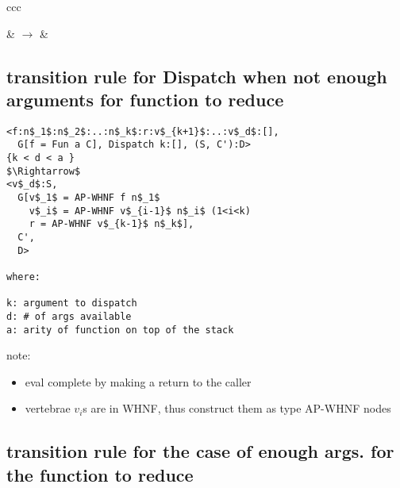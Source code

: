 \documentclass[8pt]{extarticle}
\begin{document}
\begin{multicols*}{2}
\begin{itemize}
\begin{tblr}{ccc}
 &
$\rightarrow$ &
\end{tblr}

\end{itemize}

\subsection{transition rule for Dispatch when not enough arguments for function to reduce}

\begin{lstlisting}
<f:n$_1$:n$_2$:..:n$_k$:r:v$_{k+1}$:..:v$_d$:[],
  G[f = Fun a C], Dispatch k:[], (S, C'):D>
{k < d < a }
$\Rightarrow$
<v$_d$:S,
  G[v$_1$ = AP-WHNF f n$_1$
    v$_i$ = AP-WHNF v$_{i-1}$ n$_i$ (1<i<k)
    r = AP-WHNF v$_{k-1}$ n$_k$],
  C',
  D>  

where:

k: argument to dispatch
d: # of args available
a: arity of function on top of the stack
\end{lstlisting}

note:
\begin{itemize}
\item eval complete by making a return to the caller
\item vertebrae $v_i$s are in WHNF, thus construct them as type AP-WHNF nodes
\end{itemize}

\subsection{transition rule for the case of enough args. for the function to reduce}


\end{multicols*}
\end{document}
